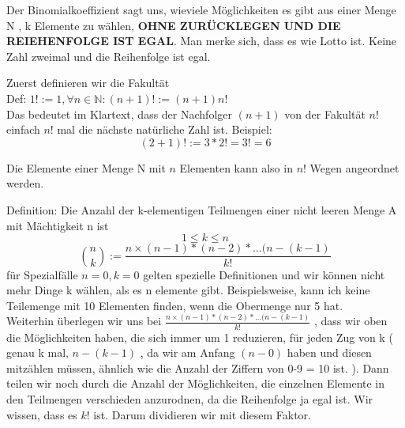 \documentclass[smallheadings,headsepline,12pt,a4paper]{scrartcl}
\begin{document}
\item Der Binomialkoeffizient sagt uns, wieviele Möglichkeiten es gibt aus einer Menge N , k Elemente zu wählen, \textbf{OHNE ZURÜCKLEGEN UND DIE REIEHENFOLGE IST EGAL}. Man merke sich, dass es wie Lotto ist. Keine Zahl zweimal und die Reihenfolge ist egal.
\item Zuerst definieren wir die Fakultät \\
Def: $1!:=1, \forall n\in \mathbb{N} : (n+1)! := (n+1)n! $ \\
Das bedeutet im Klartext, dass der Nachfolger $(n+1)$ von der Fakultät $n!$ einfach $n!$ mal die nächste natürliche Zahl ist. Beispiel:
$$ (2+1)! := 3 * 2! = 3! = 6 $$
\item Die Elemente einer Menge N mit $n$ Elementen kann also in $n!$ Wegen angeordnet werden.
\item Definition: Die Anzahl der k-elementigen Teilmengen einer nicht leeren Menge A mit Mächtigkeit n ist 
$$ 1 \leq k \leq n $$
$$ \binom{n}{k}:= \frac{n\times (n-1)* (n-2)*...(n-(k-1)}{k!} $$ 
für Spezialfälle $n=0, k=0 $ gelten spezielle Definitionen und wir können nicht mehr Dinge k wählen, als es n elemente gibt. Beispielsweise, kann ich keine Teilemenge mit 10 Elementen finden, wenn die Obermenge nur 5 hat.  \\
Weiterhin überlegen wir uns bei $\frac{n\times (n-1)* (n-2)*...(n-(k-1)}{k!}$ , dass wir oben die Möglichkeiten haben, die sich immer um 1 reduzieren, für jeden Zug von k ( genau k mal, $ n-(k-1) $ , da wir am Anfang $(n-0)$ haben und diesen mitzählen müssen, ähnlich wie die Anzahl der Ziffern von 0-9 = 10 ist. ). Dann teilen wir noch durch die Anzahl der Möglichkeiten, die einzelnen Elemente in den Teilmengen verschieden anzurodnen, da die Reihenfolge ja egal ist. Wir wissen, dass es $k!$ ist. Darum dividieren wir mit diesem Faktor. \\
\end{document}
